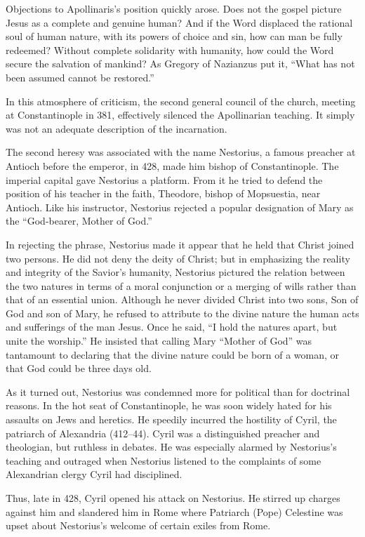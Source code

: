 Objections to Apollinaris’s position quickly arose. Does not the gospel picture Jesus as a complete
and genuine human? And if the Word displaced the rational soul of human nature, with its powers of
choice and sin, how can man be fully redeemed? Without complete solidarity with humanity, how could
the Word secure the salvation of mankind? As Gregory of Nazianzus put it, “What has not been assumed
cannot be restored.”

In this atmosphere of criticism, the second general council of the church, meeting at Constantinople
in 381, effectively silenced the Apollinarian teaching. It simply was not an adequate description of
the incarnation.

The second heresy was associated with the name Nestorius, a famous preacher at Antioch before the
emperor, in 428, made him bishop of Constantinople. The imperial capital gave Nestorius a platform.
From it he tried to defend the position of his teacher in the faith, Theodore, bishop of Mopsuestia,
near Antioch. Like his instructor, Nestorius rejected a popular designation of Mary as the
“God-bearer, Mother of God.”

In rejecting the phrase, Nestorius made it appear that he held that Christ joined two persons. He
did not deny the deity of Christ; but in emphasizing the reality and integrity of the Savior’s
humanity, Nestorius pictured the relation between the two natures in terms of a moral conjunction or
a merging of wills rather than that of an essential union. Although he never divided Christ into two
sons, Son of God and son of Mary, he refused to attribute to the divine nature the human acts and
sufferings of the man Jesus. Once he said, “I hold the natures apart, but unite the worship.” He
insisted that calling Mary “Mother of God” was tantamount to declaring that the divine nature could
be born of a woman, or that God could be three days old.

As it turned out, Nestorius was condemned more for political than for doctrinal reasons. In the hot
seat of Constantinople, he was soon widely hated for his assaults on Jews and heretics. He speedily
incurred the hostility of Cyril, the patriarch of Alexandria (412–44). Cyril was a distinguished
preacher and theologian, but ruthless in debates. He was especially alarmed by Nestorius’s teaching
and outraged when Nestorius listened to the complaints of some Alexandrian clergy Cyril had
disciplined.

Thus, late in 428, Cyril opened his attack on Nestorius. He stirred up charges against him and
slandered him in Rome where Patriarch (Pope) Celestine was upset about Nestorius’s welcome of
certain exiles from Rome.

